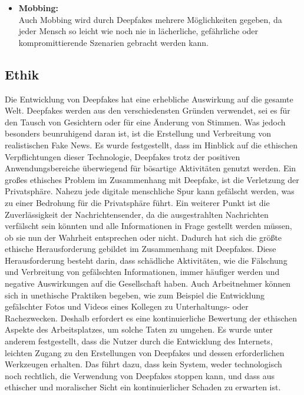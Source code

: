 \begin{itemize}
    \item \textbf{Mobbing:} \\
    Auch Mobbing wird durch Deepfakes mehrere Möglichkeiten gegeben, da jeder Mensch so leicht wie noch nie in lächerliche, gefährliche oder kompromittierende Szenarien gebracht werden kann.\cite{ResearchGate}
\end{itemize}

\subsection{Ethik}

Die Entwicklung von Deepfakes hat eine erhebliche Auswirkung auf die gesamte Welt. Deepfakes werden aus den verschiedensten Gründen verwendet, sei es für den Tausch von Gesichtern oder für eine Änderung von Stimmen.\newline
Was jedoch besonders beunruhigend daran ist, ist die Erstellung und Verbreitung von realistischen Fake News. Es wurde festgestellt, dass im Hinblick auf die ethischen Verpflichtungen dieser Technologie, Deepfakes trotz der positiven Anwendungsbereiche überwiegend für bösartige Aktivitäten genutzt werden.\newline
Ein großes ethisches Problem im Zusammenhang mit Deepfake, ist die Verletzung der Privatsphäre. Nahezu jede digitale menschliche Spur kann gefälscht werden, was zu einer Bedrohung für die Privatsphäre führt. Ein weiterer Punkt ist die Zuverlässigkeit der Nachrichtensender, da die ausgestrahlten Nachrichten verfälscht sein könnten und alle Informationen in Frage gestellt werden müssen, ob sie nun der Wahrheit entsprechen oder nicht.\newline
Dadurch hat sich die größte ethische Herausforderung gebildet im Zusammenhang mit Deepfakes. Diese Herausforderung besteht darin, dass schädliche Aktivitäten, wie die Fälschung und Verbreitung von gefälschten Informationen, immer häufiger werden und negative Auswirkungen auf die Gesellschaft haben.\newline
Auch Arbeitnehmer können sich in unethische Praktiken begeben, wie zum Beispiel die Entwicklung gefälschter Fotos und Videos eines Kollegen zu Unterhaltungs- oder Rachezwecken. Deshalb erfordert es eine kontinuierliche Bewertung der ethischen Aspekte des Arbeitsplatzes, um solche Taten zu umgehen.
Es wurde unter anderem festgestellt, dass die Nutzer durch die Entwicklung des Internets, leichten Zugang zu den Erstellungen von Deepfakes und dessen erforderlichen Werkzeugen erhalten. Das führt dazu, dass kein System, weder technologisch noch rechtlich, die Verwendung von Deepfakes stoppen kann, und dass aus ethischer und moralischer Sicht ein kontinuierlicher Schaden zu erwarten ist.\cite{Jatit}